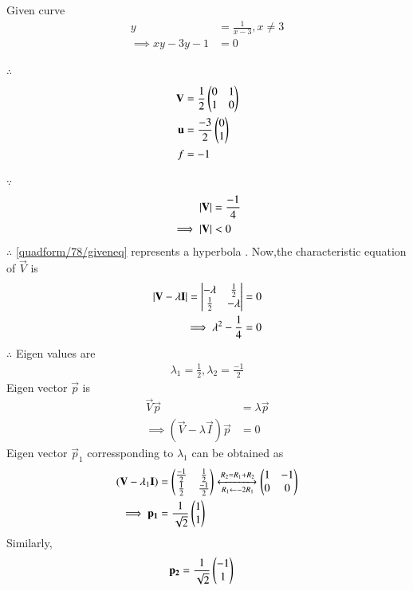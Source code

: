 
Given curve  
\begin{align}
    y &= \frac{1}{x-3} , x \neq 3 \label{quadform/78/giveneq}
    \\
    \implies xy - 3y - 1 &= 0
\end{align}

$\therefore$
\begin{align}
    \mathbf{V} &= \frac{1}{2}\begin{pmatrix}0 & 1 \\ 1 & 0\end{pmatrix}
    \\
    \mathbf{u} &= \frac{-3}{2}\begin{pmatrix}0 \\ 1\end{pmatrix}
    \\
    f &= -1
\end{align}

$\because$
\begin{align}
    \left\vert\mathbf{V}\right\vert &= \frac{-1}{4}
    \\
    \implies \left\vert\mathbf{V}\right\vert &< 0
\end{align}
$\therefore$ \eqref{quadform/78/giveneq} represents a hyperbola .
Now,the characteristic equation of $\vec{V}$ is 
\begin{align}
    \left\vert\mathbf{V} - \lambda\mathbf{I}\right\vert = \begin{vmatrix}-\lambda & \frac{1}{2} \\ \frac{1}{2} & -\lambda\end{vmatrix} &= 0
    \\
    \implies \lambda^2 - \frac{1}{4} &= 0
\end{align}
$\therefore$ Eigen values are 
\begin{align}
    \lambda_1 = \frac{1}{2} , \lambda_2 = \frac{-1}{2}
\end{align}
Eigen vector $\vec{p}$ is 
\begin{align}
    \vec{V}\vec{p} &= \lambda\vec{p}
    \\
    \implies (\vec{V} - \lambda\vec{I})\vec{p} &= 0
\end{align}
Eigen vector $\vec{p}_1$ corressponding to $\lambda_1$ can be obtained as
\begin{align}
    (\mathbf{V} - \lambda_1\mathbf{I}) &= \begin{pmatrix}\frac{-1}{2} & \frac{1}{2} \\ \frac{1}{2} & \frac{-1}{2}\end{pmatrix}\xleftrightarrow[R_1 \leftarrow -2R_1]{R_2 = R_1 + R_2}\begin{pmatrix}1 & -1 \\ 0 & 0\end{pmatrix}
    \\
    \implies \mathbf{p_1} &= \frac{1}{\sqrt{2}}\begin{pmatrix}1 \\ 1\end{pmatrix}
\end{align}
Similarly,
\begin{align}
    \mathbf{p_2} &= \frac{1}{\sqrt{2}}\begin{pmatrix}-1 \\ 1\end{pmatrix}
\end{align}
